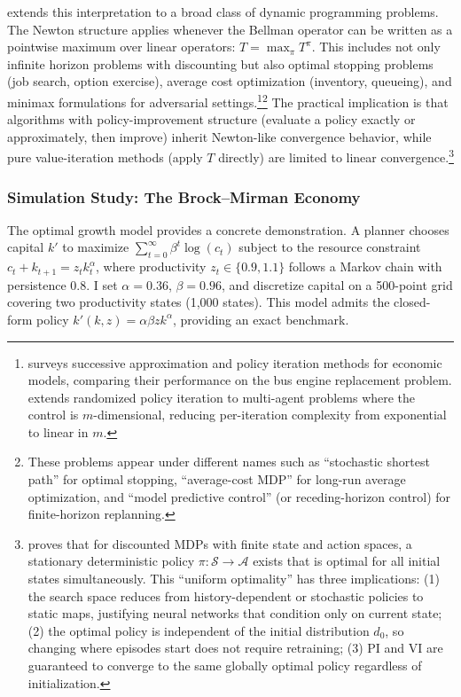 \citet{bertsekas2022newton} extends this interpretation to a broad class of dynamic programming problems. The Newton structure applies whenever the Bellman operator can be written as a pointwise maximum over linear operators: $T = \max_\pi T^\pi$. This includes not only infinite horizon problems with discounting but also optimal stopping problems (job search, option exercise), average cost optimization (inventory, queueing), and minimax formulations for adversarial settings.\footnote{\citet{rust1996numerical} surveys successive approximation and policy iteration methods for economic models, comparing their performance on the bus engine replacement problem. \citet{zhang2023distributed} extends randomized policy iteration to multi-agent problems where the control is $m$-dimensional, reducing per-iteration complexity from exponential to linear in $m$.}\footnote{These problems appear under different names such as ``stochastic shortest path'' for optimal stopping, ``average-cost MDP'' for long-run average optimization, and ``model predictive control'' (or receding-horizon control) for finite-horizon replanning.} The practical implication is that algorithms with policy-improvement structure (evaluate a policy exactly or approximately, then improve) inherit Newton-like convergence behavior, while pure value-iteration methods (apply $T$ directly) are limited to linear convergence.\footnote{\citet{blackwell1965} proves that for discounted MDPs with finite state and action spaces, a stationary deterministic policy $\pi: \mathcal{S} \to \mathcal{A}$ exists that is optimal for all initial states simultaneously. This ``uniform optimality'' has three implications: (1) the search space reduces from history-dependent or stochastic policies to static maps, justifying neural networks that condition only on current state; (2) the optimal policy is independent of the initial distribution $d_0$, so changing where episodes start does not require retraining; (3) PI and VI are guaranteed to converge to the same globally optimal policy regardless of initialization.}

\subsubsection{Simulation Study: The Brock--Mirman Economy}
\label{sec:brock_mirman_sim}

The \citet{brockmirman1972} optimal growth model provides a concrete demonstration. A planner chooses capital $k'$ to maximize $\sum_{t=0}^\infty \beta^t \log(c_t)$ subject to the resource constraint $c_t + k_{t+1} = z_t k_t^\alpha$, where productivity $z_t \in \{0.9, 1.1\}$ follows a Markov chain with persistence 0.8. I set $\alpha = 0.36$, $\beta = 0.96$, and discretize capital on a 500-point grid covering two productivity states (1,000 states). This model admits the closed-form policy $k'(k,z) = \alpha\beta z k^\alpha$, providing an exact benchmark.

